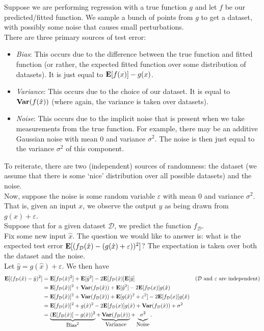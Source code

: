 \documentclass{article}
\begin{document}
			Suppose we are performing regression with a true function $g$ and let $f$ be our predicted/fitted function. We sample a bunch of points from $g$ to get a dataset, with possibly some noise that causes small perturbations.\\
			There are three primary sources of test error:
			\begin{itemize}
				\item \emph{Bias}: This occurs due to the difference between the true function and fitted function (or rather, the expected fitted function over some distribution of datasets). It is just equal to $\textbf{E}[f(x)] - g(x)$.
				\item \emph{Variance}: This occurs due to the choice of our dataset. It is equal to $\operatorname{\textbf{Var}}(f(\hat{x}))$ (where again, the variance is taken over datasets).
				\item \emph{Noise}: This occurs due to the implicit noise that is present when we take measurements from the true function. For example, there may be an additive Gaussian noise with mean $0$ and variance $\sigma^2$. The noise is then just equal to the variance $\sigma^2$ of this component.
			\end{itemize}

			To reiterate, there are two (independent) sources of randomness: the dataset (we assume that there is some `nice' distribution over all possible datasets) and the noise.\\
			Now, suppose the noise is some random variable $\varepsilon$ with mean $0$ and variance $\sigma^2$. That is, given an input $x$, we observe the output $y$ as being drawn from $g(x)+\varepsilon$.\\
			Suppose that for a given dataset $\mathcal{D}$, we predict the function $f_\mathcal{D}$.\\
			Fix some new input $\hat{x}$. The question we would like to answer is: what is the expected test error $\textbf{E}[(f_{\mathcal{D}}(\hat{x}) - (g(\hat{x}) + \varepsilon))^2]$? The expectation is taken over both the dataset and the noise.\\
			Let $\hat{y} = g(\hat{x}) + \varepsilon$. We then have
			\begin{align*}
				\textbf{E}[(f_\mathcal{D}(\hat{x}) - \hat{y})^2] &= \textbf{E}[f_\mathcal{D}(\hat{x})^2] + \textbf{E}[\hat{y}^2] - 2 \textbf{E}[f_\mathcal{D}(\hat{x})]\textbf{E}[\hat{y}] & \text{($\mathcal{D}$ and $\varepsilon$ are independent)} \\
					&= \textbf{E}[f_\mathcal{D}(\hat{x})]^2 + \operatorname{\textbf{Var}}(f_\mathcal{D}(\hat{x})) + \textbf{E}[\hat{y}^2] - 2 \textbf{E}[f_\mathcal{D}(x)] g(\hat{x}) \\
					&= \textbf{E}[f_\mathcal{D}(\hat{x})]^2 + \operatorname{\textbf{Var}}(f_\mathcal{D}(\hat{x})) + \textbf{E}[g(\hat{x})^2 + \varepsilon^2] - 2 \textbf{E}[f_\mathcal{D}(x)] g(\hat{x}) \\
					&= \textbf{E}[f_\mathcal{D}(\hat{x})]^2  + g(\hat{x})^2 - 2 \textbf{E}[f_\mathcal{D}(x)] g(\hat{x}) + \operatorname{\textbf{Var}}(f_\mathcal{D}(\hat{x})) + \sigma^2 \\
					&= \underbrace{(\textbf{E}[f_\mathcal{D}(\hat{x})] - g(\hat{x}))^2}_{\textstyle\text{Bias$^2$}} + \underbrace{\operatorname{\textbf{Var}}(f_\mathcal{D}(\hat{x}))}_{\textstyle\text{Variance}} + \underbrace{\sigma^2 \mathstrut}_{\textstyle\text{Noise}}.
			\end{align*}
\end{document}
